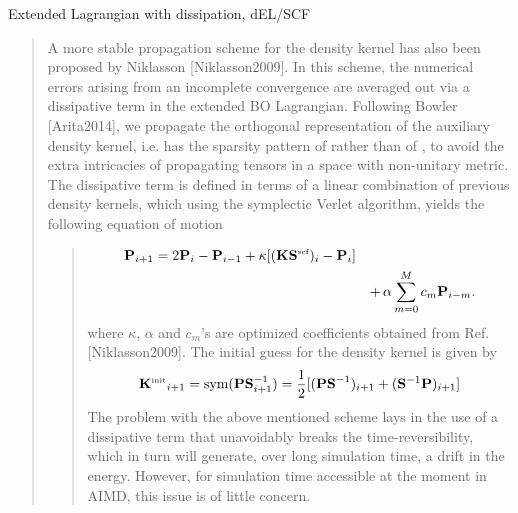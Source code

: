 \documentclass[letterpaper,10pt,english]{sphinxmanual}
\begin{document}
Extended Lagrangian with dissipation, dEL/SCF
\begin{quote}

\begin{DUlineblock}{0em}
\item[] A more stable propagation scheme for the density kernel has also
been proposed by Niklasson {[}Niklasson2009{]}. In
this scheme, the numerical errors arising from an incomplete
convergence are averaged out via a dissipative term in the
extended BO Lagrangian. Following
Bowler {[}Arita2014{]}, we propagate the orthogonal
representation  of the auxiliary density kernel, i.e. 
has the sparsity pattern of  rather than of , to avoid
the extra intricacies of propagating tensors in a space with
non-unitary metric. The dissipative term is defined in terms of a
linear combination of previous density kernels, which using the
symplectic Verlet algorithm, yields the following equation of
motion
\end{DUlineblock}
\begin{quote}
\begin{equation*}
\begin{split}\begin{aligned}
\mathbf{P}_{i+1} &= 2\mathbf{P}_{i} - \mathbf{P}_{i - 1} + \kappa[(\mathbf{KS}{^{\mbox{\tiny{scf}}}})_i - \mathbf{P}_{i}] \nonumber \\
 &&+ \,\alpha\sum_{m=0}^M c_m \mathbf{P}_{i-m}. \end{aligned}\end{split}
\end{equation*}
where \(\kappa\), \(\alpha\) and \(c_m\)’s are
optimized coefficients obtained from
Ref. {[}Niklasson2009{]}. The initial guess for the
density kernel is given by
\begin{equation*}
\begin{split}\mathbf{K}{^{\mbox{\tiny{init}}}}_{i+1} = \mbox{sym}(\mathbf{PS}^{-1}_{i+1}) = \frac{1}{2}[(\mathbf{PS}^{-1})_{i+1} + (\mathbf{S}^{-1}\mathbf{P})_{i+1}]\end{split}
\end{equation*}
The problem with the above mentioned scheme lays in the use of a
dissipative term that unavoidably breaks the time-reversibility,
which in turn will generate, over long simulation time, a drift in
the energy. However, for simulation time accessible at the moment
in AIMD, this issue is of little concern.
\end{quote}
\end{quote}
\end{document}
